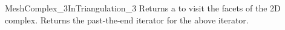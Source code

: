 \begin{ccRefConcept}{MeshComplex_3InTriangulation_3}
{Returns a  to visit the facets
of the 2D complex.}
\ccGlue
{}
{Returns the  past-the-end iterator for the above iterator.}




\ccHasModels
{}


\ccSeeAlso
{} \\






\end{ccRefConcept}

\ccRefPageEnd

